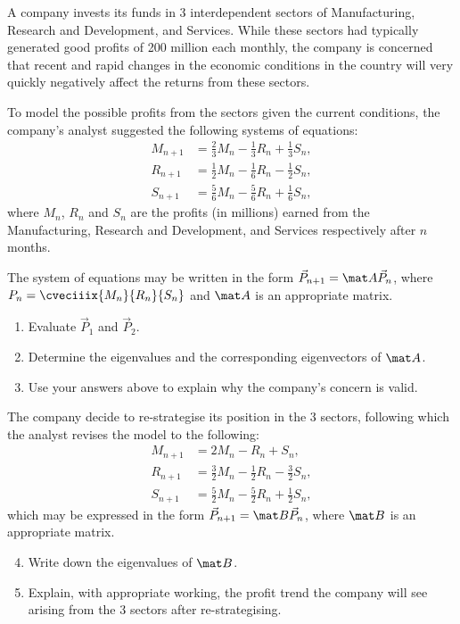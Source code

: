 \begin{problem}
    A company invests its funds in 3 interdependent sectors of Manufacturing, Research and Development, and Services. While these sectors had typically generated good profits of 200 million each monthly, the company is concerned that recent and rapid changes in the economic conditions in the country will very quickly negatively affect the returns from these sectors.

    To model the possible profits from the sectors given the current conditions, the company's analyst suggested the following systems of equations:
    \begin{align*}
        M_{n+1} &= \frac23 M_n - \frac13 R_n + \frac13 S_n,\\
        R_{n+1} &= \frac12 M_n - \frac16 R_n - \frac12 S_n,\\
        S_{n+1} &= \frac56 M_n - \frac56 R_n + \frac16 S_n,
    \end{align*}
    where $M_n$, $R_n$ and $S_n$ are the profits (in millions) earned from the Manufacturing, Research and Development, and Services respectively after $n$ months.

    The system of equations may be written in the form $\vec P_{n+1} = \mat A \vec P_n$, where $P_n = \cveciiix{M_n}{R_n}{S_n}$ and $\mat A$ is an appropriate matrix.

    \begin{enumerate}
        \item Evaluate $\vec P_1$ and $\vec P_2$.
        \item Determine the eigenvalues and the corresponding eigenvectors of $\mat A$.
        \item Use your answers above to explain why the company's concern is valid.
    \end{enumerate}

    The company decide to re-strategise its position in the 3 sectors, following which the analyst revises the model to the following:
    \begin{align*}
        M_{n+1} &= 2 M_n - R_n + S_n,\\
        R_{n+1} &= \frac32 M_n - \frac12 R_n - \frac32 S_n,\\
        S_{n+1} &= \frac52 M_n - \frac52 R_n + \frac12 S_n,
    \end{align*}
    which may be expressed in the form $\vec P_{n+1} = \mat B \vec P_n$, where $\mat B$ is an appropriate matrix.

    \begin{enumerate}
        \setcounter{enumi}{3}
        \item Write down the eigenvalues of $\mat B$.
        \item Explain, with appropriate working, the profit trend the company will see arising from the 3 sectors after re-strategising.
    \end{enumerate}
\end{problem}
